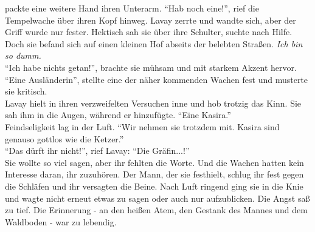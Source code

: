 packte eine weitere Hand ihren Unterarm. ``Hab noch eine!'', rief die Tempelwache über ihren Kopf 
hinweg. Lavay zerrte und wandte sich, aber der Griff wurde nur fester. Hektisch sah sie über ihre 
Schulter, suchte nach Hilfe. Doch sie befand sich auf einen kleinen Hof abseits der belebten 
Straßen. \textit{Ich bin so dumm.}\\
``Ich habe nichts getan!'', brachte sie mühsam und mit starkem Akzent hervor.\\
``Eine Ausländerin'', stellte eine der näher kommenden Wachen fest und musterte sie kritisch.\\
Lavay hielt in ihren verzweifelten Versuchen inne und hob trotzig das Kinn. Sie sah ihm in die 
Augen, während er hinzufügte. ``Eine Kasira.''\\
Feindseligkeit lag in der Luft. ``Wir nehmen sie trotzdem mit. Kasira sind genauso gottlos wie die 
Ketzer.''\\
``Das dürft ihr nicht!'', rief Lavay: ``Die Gräfin...!''\\
Sie wollte so viel sagen, aber ihr fehlten die Worte. Und die Wachen hatten kein Interesse daran, 
ihr zuzuhören. Der Mann, der sie festhielt, schlug ihr fest gegen die Schläfen und ihr versagten 
die Beine. Nach Luft ringend ging sie in die Knie und wagte nicht erneut etwas zu sagen oder auch 
nur aufzublicken. Die Angst saß zu tief. Die Erinnerung - an den heißen Atem, den Gestank des Mannes 
und dem Waldboden - war zu lebendig.\\

